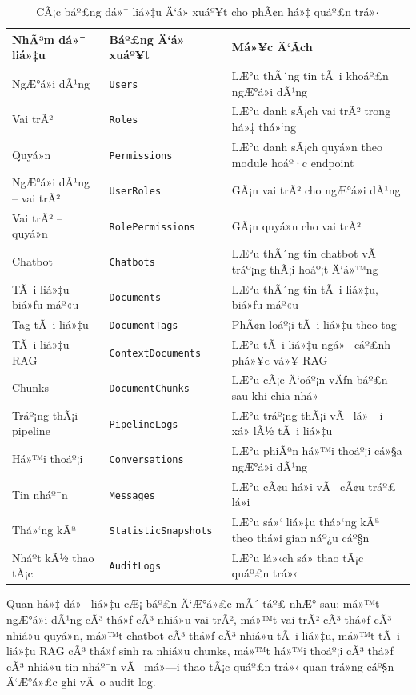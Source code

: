 ﻿\documentclass[12pt,a4paper]{report}
\begin{document}
\begin{table}[H]
\centering
\caption{CÃ¡c báº£ng dá»¯ liá»‡u Ä‘á» xuáº¥t cho phÃ¢n há»‡ quáº£n trá»‹}
\label{tab:admin-db}
\begin{tabular}{|p{4cm}|p{5cm}|p{6cm}|}
\hline
\textbf{NhÃ³m dá»¯ liá»‡u} & \textbf{Báº£ng Ä‘á» xuáº¥t} & \textbf{Má»¥c Ä‘Ã­ch} \\ \hline
NgÆ°á»i dÃ¹ng & \texttt{Users} & LÆ°u thÃ´ng tin tÃ i khoáº£n ngÆ°á»i dÃ¹ng \\ \hline
Vai trÃ² & \texttt{Roles} & LÆ°u danh sÃ¡ch vai trÃ² trong há»‡ thá»‘ng \\ \hline
Quyá»n & \texttt{Permissions} & LÆ°u danh sÃ¡ch quyá»n theo module hoáº·c endpoint \\ \hline
NgÆ°á»i dÃ¹ng -- vai trÃ² & \texttt{UserRoles} & GÃ¡n vai trÃ² cho ngÆ°á»i dÃ¹ng \\ \hline
Vai trÃ² -- quyá»n & \texttt{RolePermissions} & GÃ¡n quyá»n cho vai trÃ² \\ \hline
Chatbot & \texttt{Chatbots} & LÆ°u thÃ´ng tin chatbot vÃ  tráº¡ng thÃ¡i hoáº¡t Ä‘á»™ng \\ \hline
TÃ i liá»‡u biá»ƒu máº«u & \texttt{Documents} & LÆ°u thÃ´ng tin tÃ i liá»‡u, biá»ƒu máº«u \\ \hline
Tag tÃ i liá»‡u & \texttt{DocumentTags} & PhÃ¢n loáº¡i tÃ i liá»‡u theo tag \\ \hline
TÃ i liá»‡u RAG & \texttt{ContextDocuments} & LÆ°u tÃ i liá»‡u ngá»¯ cáº£nh phá»¥c vá»¥ RAG \\ \hline
Chunks & \texttt{DocumentChunks} & LÆ°u cÃ¡c Ä‘oáº¡n vÄƒn báº£n sau khi chia nhá» \\ \hline
Tráº¡ng thÃ¡i pipeline & \texttt{PipelineLogs} & LÆ°u tráº¡ng thÃ¡i vÃ  lá»—i xá»­ lÃ½ tÃ i liá»‡u \\ \hline
Há»™i thoáº¡i & \texttt{Conversations} & LÆ°u phiÃªn há»™i thoáº¡i cá»§a ngÆ°á»i dÃ¹ng \\ \hline
Tin nháº¯n & \texttt{Messages} & LÆ°u cÃ¢u há»i vÃ  cÃ¢u tráº£ lá»i \\ \hline
Thá»‘ng kÃª & \texttt{StatisticSnapshots} & LÆ°u sá»‘ liá»‡u thá»‘ng kÃª theo thá»i gian náº¿u cáº§n \\ \hline
Nháº­t kÃ½ thao tÃ¡c & \texttt{AuditLogs} & LÆ°u lá»‹ch sá»­ thao tÃ¡c quáº£n trá»‹ \\ \hline
\end{tabular}
\end{table}

Quan há»‡ dá»¯ liá»‡u cÆ¡ báº£n Ä‘Æ°á»£c mÃ´ táº£ nhÆ° sau: má»™t ngÆ°á»i dÃ¹ng cÃ³ thá»ƒ cÃ³ nhiá»u vai trÃ², má»™t vai trÃ² cÃ³ thá»ƒ cÃ³ nhiá»u quyá»n, má»™t chatbot cÃ³ thá»ƒ cÃ³ nhiá»u tÃ i liá»‡u, má»™t tÃ i liá»‡u RAG cÃ³ thá»ƒ sinh ra nhiá»u chunks, má»™t há»™i thoáº¡i cÃ³ thá»ƒ cÃ³ nhiá»u tin nháº¯n vÃ  má»—i thao tÃ¡c quáº£n trá»‹ quan trá»ng cáº§n Ä‘Æ°á»£c ghi vÃ o audit log.
\end{document}

